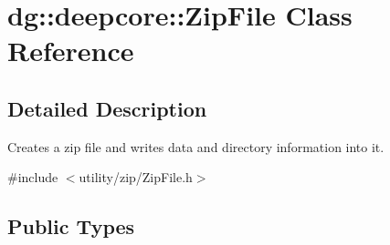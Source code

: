 \hypertarget{classdg_1_1deepcore_1_1_zip_file}{}\section{dg\+:\+:deepcore\+:\+:Zip\+File Class Reference}
\label{classdg_1_1deepcore_1_1_zip_file}


\subsection{Detailed Description}
Creates a zip file and writes data and directory information into it. 

{\ttfamily \#include $<$utility/zip/\+Zip\+File.\+h$>$}

\subsection*{Public Types}
